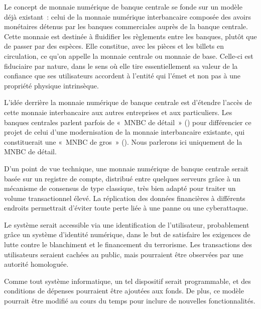
Le concept de monnaie numérique de banque centrale se fonde sur un modèle déjà existant~: celui de la monnaie numérique interbancaire composée des avoirs monétaires détenus par les banques commerciales auprès de la banque centrale. Cette monnaie est destinée à fluidifier les règlements entre les banques, plutôt que de passer par des espèces. Elle constitue, avec les pièces et les billets en circulation, ce qu'on appelle la monnaie centrale ou monnaie de base. Celle-ci est fiduciaire par nature, dans le sens où elle tire essentiellement sa valeur de la confiance que ses utilisateurs accordent à l'entité qui l'émet et non pas à une propriété physique intrinsèque.

L'idée derrière la monnaie numérique de banque centrale est d'étendre l'accès de cette monnaie interbancaire aux autres entreprises et aux particuliers. Les banques centrales parlent parfois de «~MNBC de détail~» () pour différencier ce projet de celui d'une modernisation de la monnaie interbancaire existante, qui constituerait une «~MNBC de gros~» (). Nous parlerons ici uniquement de la MNBC de détail.


D'un point de vue technique, une monnaie numérique de banque centrale serait basée sur un registre de compte, distribué entre quelques serveurs grâce à un mécanisme de consensus de type classique, très bien adapté pour traiter un volume transactionnel élevé. La réplication des données financières à différents endroits permettrait d'éviter toute perte liée à une panne ou une cyberattaque.

Le système serait accessible via une identification de l'utilisateur, probablement grâce un système d'identité numérique, dans le but de satisfaire les exigences de lutte contre le blanchiment et le financement du terrorisme. Les transactions des utilisateurs seraient cachées au public, mais pourraient être observées par une autorité homologuée.

Comme tout système informatique, un tel dispositif serait programmable, et des conditions de dépenses pourraient être ajoutées aux fonds. De plus, ce modèle pourrait être modifié au cours du temps pour inclure de nouvelles fonctionnalités.

